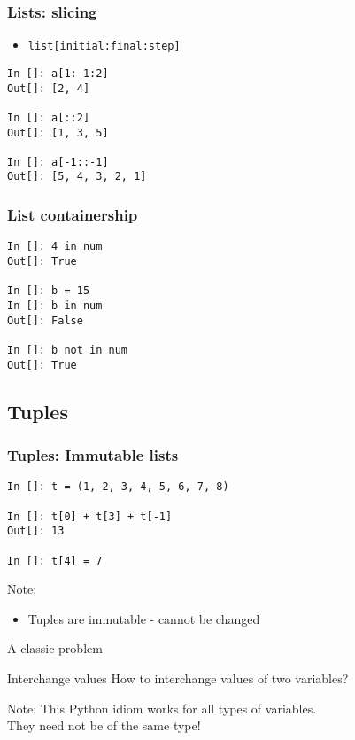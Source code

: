 \documentclass[14pt,compress]{beamer}
\newcounter{time}
\newcommand{\inctime}[1]{\addtocounter{time}{#1}{\tiny \thetime\ m}}
\newcommand{\typ}[1]{\lstinline{#1}}
\begin{document}
\begin{frame}[fragile]
  \frametitle{Lists: slicing}
  \begin{itemize}
    \item \typ{list[initial:final:step]}
  \end{itemize}
\begin{lstlisting}
In []: a[1:-1:2]
Out[]: [2, 4]

In []: a[::2]
Out[]: [1, 3, 5]

In []: a[-1::-1]
Out[]: [5, 4, 3, 2, 1]
\end{lstlisting}
\end{frame}

\begin{frame}[fragile]
\frametitle{List containership}
\begin{lstlisting}
In []: 4 in num
Out[]: True

In []: b = 15
In []: b in num
Out[]: False

In []: b not in num
Out[]: True
\end{lstlisting}
\end{frame}

\subsection{Tuples}
\begin{frame}[fragile]
\frametitle{Tuples: Immutable lists}
\begin{lstlisting}
In []: t = (1, 2, 3, 4, 5, 6, 7, 8)

In []: t[0] + t[3] + t[-1]
Out[]: 13

In []: t[4] = 7 
\end{lstlisting}
\pause
\begin{block}{Note:}
\begin{itemize}
  \item Tuples are immutable - cannot be changed
\end{itemize}
\end{block}
  \inctime{10}
\end{frame}

\begin{frame}
  {A classic problem}
  \begin{block}
    {Interchange values}
    How to interchange values of two variables? 
  \end{block}
  \pause
  \begin{block}{Note:}
    This Python idiom works for all types of variables.\\
They need not be of the same type!
  \end{block}
\end{frame}
\end{document}
